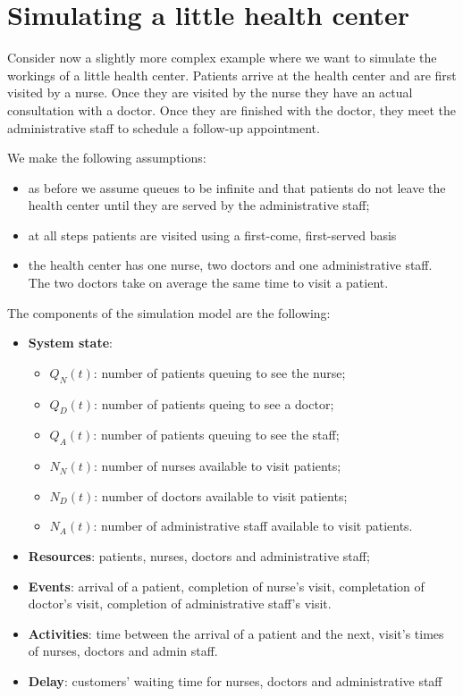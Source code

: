 \documentclass[
]{book}
\theoremstyle{definition}
\theoremstyle{definition}
\theoremstyle{definition}
\theoremstyle{definition}
\theoremstyle{remark}
\begin{document}
\hypertarget{simulating-a-little-health-center}{%
\section{Simulating a little health center}\label{simulating-a-little-health-center}}

Consider now a slightly more complex example where we want to simulate the workings of a little health center. Patients arrive at the health center and are first visited by a nurse. Once they are visited by the nurse they have an actual consultation with a doctor. Once they are finished with the doctor, they meet the administrative staff to schedule a follow-up appointment.

We make the following assumptions:

\begin{itemize}
\item
  as before we assume queues to be infinite and that patients do not leave the health center until they are served by the administrative staff;
\item
  at all steps patients are visited using a first-come, first-served basis
\item
  the health center has one nurse, two doctors and one administrative staff. The two doctors take on average the same time to visit a patient.
\end{itemize}

The components of the simulation model are the following:

\begin{itemize}
\item
  \textbf{System state}:

  \begin{itemize}
  \item
    \(Q_N(t)\): number of patients queuing to see the nurse;
  \item
    \(Q_D(t)\): number of patients queing to see a doctor;
  \item
    \(Q_A(t)\): number of patients queuing to see the staff;
  \item
    \(N_N(t)\): number of nurses available to visit patients;
  \item
    \(N_D(t)\): number of doctors available to visit patients;
  \item
    \(N_A(t)\): number of administrative staff available to visit patients.
  \end{itemize}
\item
  \textbf{Resources}: patients, nurses, doctors and administrative staff;
\item
  \textbf{Events}: arrival of a patient, completion of nurse's visit, completation of doctor's visit, completion of administrative staff's visit.
\item
  \textbf{Activities}: time between the arrival of a patient and the next, visit's times of nurses, doctors and admin staff.
\item
  \textbf{Delay}: customers' waiting time for nurses, doctors and administrative staff
\end{itemize}
\end{document}
